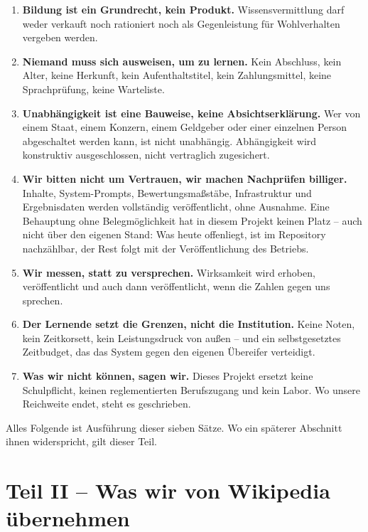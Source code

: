 \documentclass[11pt,a4paper]{article}
\newcommand{\teilnummerierung}[1]{%
    \setcounter{section}{0}%
    \renewcommand{\thesection}{#1.\arabic{section}}%
    \renewcommand{\theHsection}{#1.\arabic{section}}%
}
\begin{document}
\begin{enumerate}[label=\textbf{\arabic*.}, leftmargin=2em]
    \item \textbf{Bildung ist ein Grundrecht, kein Produkt.} Wissensvermittlung darf weder verkauft noch rationiert noch als Gegenleistung für Wohlverhalten vergeben werden.
    \item \textbf{Niemand muss sich ausweisen, um zu lernen.} Kein Abschluss, kein Alter, keine Herkunft, kein Aufenthaltstitel, kein Zahlungsmittel, keine Sprachprüfung, keine Warteliste.
    \item \textbf{Unabhängigkeit ist eine Bauweise, keine Absichtserklärung.} Wer von einem Staat, einem Konzern, einem Geldgeber oder einer einzelnen Person abgeschaltet werden kann, ist nicht unabhängig. Abhängigkeit wird konstruktiv ausgeschlossen, nicht vertraglich zugesichert.
    \item \textbf{Wir bitten nicht um Vertrauen, wir machen Nachprüfen billiger.} Inhalte, System-Prompts, Bewertungsmaßstäbe, Infrastruktur und Ergebnisdaten werden vollständig veröffentlicht, ohne Ausnahme. Eine Behauptung ohne Belegmöglichkeit hat in diesem Projekt keinen Platz -- auch nicht über den eigenen Stand: Was heute offenliegt, ist im Repository nachzählbar, der Rest folgt mit der Veröffentlichung des Betriebs.
    \item \textbf{Wir messen, statt zu versprechen.} Wirksamkeit wird erhoben, veröffentlicht und auch dann veröffentlicht, wenn die Zahlen gegen uns sprechen.
    \item \textbf{Der Lernende setzt die Grenzen, nicht die Institution.} Keine Noten, kein Zeitkorsett, kein Leistungsdruck von außen -- und ein selbstgesetztes Zeitbudget, das das System gegen den eigenen Übereifer verteidigt.
    \item \textbf{Was wir nicht können, sagen wir.} Dieses Projekt ersetzt keine Schulpflicht, keinen reglementierten Berufszugang und kein Labor. Wo unsere Reichweite endet, steht es geschrieben.
\end{enumerate}

\noindent Alles Folgende ist Ausführung dieser sieben Sätze. Wo ein späterer Abschnitt ihnen widerspricht, gilt dieser Teil.

\part*{Teil II -- Was wir von Wikipedia übernehmen}
\teilnummerierung{II}
\end{document}
